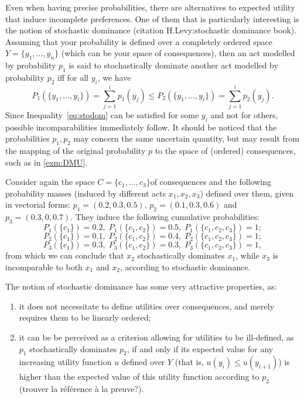 \documentclass[french, english]{llncs}
\begin{document}
	Even when having precise probabilities, there are alternatives to expected utility that induce incomplete preferences. One of them that is particularly interesting is the notion of stochastic dominance (citation H.Levy:stochastic dominance book). Assuming that your probability is defined over a completely ordered space $Y=\{y_1,\ldots,y_n\}$ (which can be your space of consequences), then an act modelled by probability $p_1$ is said to stochastically dominate another act modelled by probability $p_2$ iff for all $y_i$, we have
	\begin{equation}\label{eq:stodom}P_1(\{y_1,\ldots,y_i\})=\sum_{j=1}^i p_1(y_j) \leq P_2(\{y_1,\ldots,y_i\})=\sum_{j=1}^i p_2(y_j).\end{equation}
	Since Inequality~\eqref{eq:stodom} can be satisfied for some $y_i$ and not for others, possible incomparabilities immediately follow. It should be noticed that the probabilities $p_1,p_2$ may concern the same uncertain quantity, but may result from the mapping of the original probability $p$ to the space of (ordered) consequences, such as in \cref{exm:DMU}.
	
	\begin{example}
		Consider again the space $C=\{c_1,\ldots,c_3\}$of consequences and the following probability masses (induced by different acts $x_1,x_2,x_3$) defined over them, given in vectorial forms: $p_1=(0.2,0.3,0.5)$, $p_2=(0.1,0.3,0.6)$ and $p_3=(0.3,0,0.7)$. They induce the following cumulative probabilities:
		$$P_1(\{c_1\})=0.2, \; P_1(\{c_1,c_2\})=0.5, \; P_1(\{c_1,c_2,c_3\})=1; $$
		$$P_2(\{c_1\})=0.1, \; P_2(\{c_1,c_2\})=0.4, \; P_2(\{c_1,c_2,c_3\})=1;$$
		$$P_3(\{c_1\})=0.3, \; P_3(\{c_1,c_2\})=0.3, \; P_3(\{c_1,c_2,c_3\})=1, $$
		from which we can conclude that $x_2$ stochastically dominates $x_1$, while $x_3$ is incomparable to both $x_1$ and $x_2$, according to stochastic dominance.
	\end{example}
	
	The notion of stochastic dominance has some very attractive properties, as:
	\begin{enumerate}
		\item it does not necessitate to define utilities over consequences, and merely requires them to be linearly ordered;
		\item it can be be perceived as a criterion allowing for utilities to be ill-defined, as $p_1$ stochastically dominates $p_2$, if and only if its expected value for any increasing utility function $u$ defined over $Y$ (that is, $u(y_i) \leq u(y_{i+1})$)  is higher than the expected value of this utility function according to $p_2$ (trouver la référence à la preuve?). 
	\end{enumerate}
	
\end{document}

